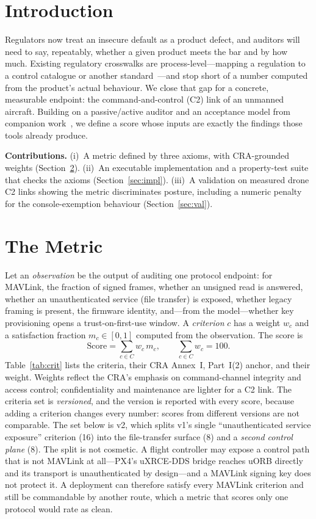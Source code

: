 \documentclass[conference]{IEEEtran}
\begin{document}
\section{Introduction}
Regulators now treat an insecure default as a product defect, and auditors will
need to say, repeatably, whether a given product meets the bar and by how much.
Existing regulatory crosswalks are process-level---mapping a regulation to a
control catalogue or another standard~\cite{ruohonen2025sok,costantino2022r155,
siddiqui2023do326a}---and stop short of a number computed from the product's
actual behaviour. We close that gap for a concrete, measurable endpoint: the
command-and-control (C2) link of an unmanned aircraft. Building on a passive/active
auditor and an acceptance model from companion
work~\cite{brighouse2026signing,brighouse2026formal}, we define a score whose
inputs are exactly the findings those tools already produce.

\noindent\textbf{Contributions.}
(i)~A metric defined by three axioms, with CRA-grounded weights
(Section~\ref{sec:metric}).
(ii)~An executable implementation and a property-test suite that checks the axioms
(Section~\ref{sec:impl}).
(iii)~A validation on measured drone C2 links showing the metric discriminates
posture, including a numeric penalty for the console-exemption behaviour
(Section~\ref{sec:val}).

\section{The Metric}
\label{sec:metric}
Let an \emph{observation} be the output of auditing one protocol endpoint: for
MAVLink, the fraction of signed frames, whether an unsigned read is answered,
whether an unauthenticated service (file transfer) is exposed, whether legacy
framing is present, the firmware identity, and---from the model---whether key
provisioning opens a trust-on-first-use window. A \emph{criterion} $c$ has a
weight $w_c$ and a satisfaction fraction $m_c\in[0,1]$ computed from the
observation. The score is
\[
\mathrm{Score}=\sum_{c\in C} w_c\, m_c, \qquad \sum_{c\in C} w_c = 100 .
\]
Table~\ref{tab:crit} lists the criteria, their CRA Annex~I, Part~I(2) anchor, and
their weight. Weights reflect the CRA's emphasis on command-channel integrity and
access control; confidentiality and maintenance are lighter for a C2 link. The criteria
set is \emph{versioned}, and the version is reported with every score, because
adding a criterion changes every number: scores from different versions are not
comparable. The set below is v2, which splits v1's single
``unauthenticated service exposure'' criterion (16) into the file-transfer
surface (8) and a \emph{second control plane} (8). The split is not cosmetic. A
flight controller may expose a control path that is not MAVLink at all---PX4's
uXRCE-DDS bridge reaches uORB directly and its transport is unauthenticated by
design---and a MAVLink signing key does not protect it. A deployment can
therefore satisfy every MAVLink criterion and still be commandable by another
route, which a metric that scores only one protocol would rate as clean.
\end{document}
